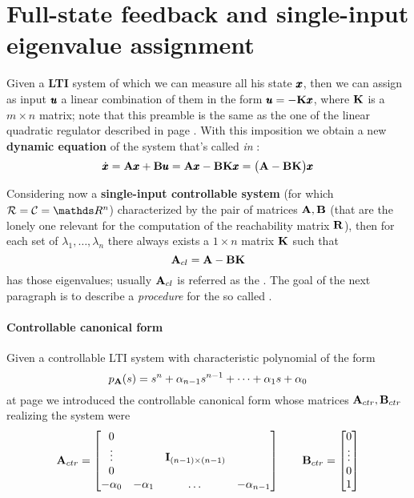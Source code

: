 \section{Full-state feedback and single-input eigenvalue assignment} \label{sec:fullstatefeed}
	Given a \textbf{LTI} system of which we can measure all his state $\pmb{x}$, then we can assign as input $\pmb{u}$ a linear combination of them in the form $\pmb{u} = -\mathbf{K} \pmb{x}$, where $\mathbf{K}$ is a $m\times n$ matrix; note that this  preamble is the same as the one of the linear quadratic regulator described in page \pageref{sec:LQR}. With this imposition we obtain a new \textbf{dynamic equation} of the system that's called \textit{in }:
	\begin{equation}
		\dot{\pmb{x}} = \mathbf{A} \pmb{x} + \mathbf{B} \pmb{u} = \mathbf{A} \pmb{x} - \mathbf{B}\mathbf{K} \pmb{x} = \big(\mathbf{A}-\mathbf{B}\mathbf{K}\big) \pmb{x}
	\end{equation}
	
	Considering now a \textbf{single-input controllable system} (for which $\reach = \ctr = \mathds R^n$) characterized by the pair of matrices $\mathbf{A},\mathbf{B}$ (that are the lonely one relevant for the computation of the reachability matrix $\mathbf{R}$), then for each set of  $\lambda_1,\dots, \lambda_n$ there always exists a $1\times n$ matrix $\mathbf{K}$ such that
	\[ \mathbf{A}_{cl} = \mathbf{A} - \mathbf{B} \mathbf{K} \]
	has those eigenvalues; usually $\mathbf{A}_{cl}$ is referred as the . The goal of the next paragraph is to describe a \textit{procedure} for the so called .
	
	\paragraph{Controllable canonical form} Given a controllable LTI system with characteristic polynomial of the form
	\[ p_{\mathbf{A}}(s) = s^n + \alpha_{n-1}s^{n-1} + \dots + \alpha_1 s + \alpha_0 \]
	at page \pageref{eq:dyn:controllablecanonical} we introduced the controllable canonical form whose matrices $\mathbf{A}_{ctr}, \mathbf{B}_{ctr}$ realizing the system were
	\[ \mathbf{A}_{ctr} = \begin{bmatrix}  0 \\ \vdots & & \mathbf{I}_{(n-1)\times(n-1)} \\ 0 \\ - \alpha_0 & - \alpha_1 & \dots & - \alpha_{n-1} \end{bmatrix} \qquad \mathbf{B}_{ctr}= \begin{bmatrix} 0\\ \vdots \\ 0 \\ 1 \end{bmatrix} \]
	
